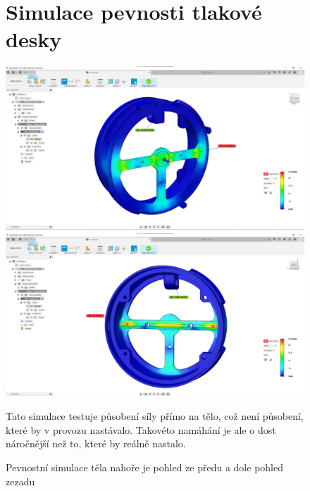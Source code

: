 \begin{figure}
\section{Simulace pevnosti tlakové desky}
    \vspace{\OdsazeniNadpisu}
    \centering
    \includegraphics[width=370pt]{kapitoly/obrazky/E4/machanika_tlakove_desky/simulace/F100N,primo,uprostred,pohled_zepredu.png}
    \includegraphics[width=370pt]{kapitoly/obrazky/E4/machanika_tlakove_desky/simulace/F100N,primo,uprostred,pohled_zezadu.png}
    \caption{Pevnostní simulace těla nahoře je pohled ze předu a dole pohled zezadu \centering}
    Tato simulace testuje působení síly přímo na tělo, což není působení, které by v provozu nastávalo. Takovéto namáhání je ale o dost náročnější
    než to, které by reálně nastalo.
    \label{fig:E4-simulace_tela} %
\end{figure}

